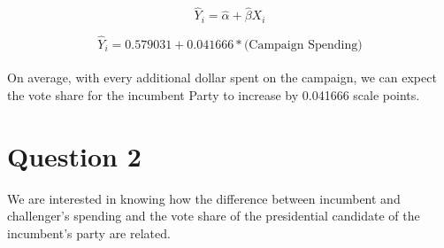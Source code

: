 \documentclass[12pt,letterpaper]{article}
\begin{document}
{\large 			$$\hat{Y}_i = \hat{\alpha} +  \hat{\beta}X_i $$}


{ 			$$\hat{Y}_i = 0.579031 +  0.041666 * \text{(Campaign Spending)} $$} \\

	
\noindent On average, with every additional dollar spent on the campaign, we can expect the vote share for the incumbent Party to increase by 0.041666 scale points. \\


	\newpage
	
	
\section*{Question 2}
\noindent We are interested in knowing how the difference between incumbent and challenger's spending and the vote share of the presidential candidate of the incumbent's party are related.	\vspace{.25cm}
\end{document}
